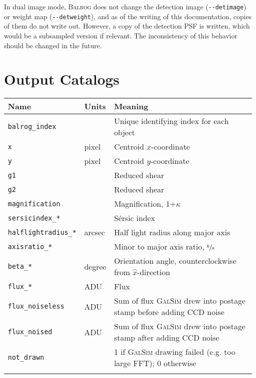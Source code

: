 \documentclass[11pt]{book}
\newcommand{\codett}[1]{\lstinline{#1}}
\newcommand{\galsim}{\textsc{GalSim}}
\newcommand{\balrog}{\textsc{Balrog}}
\newcommand{\opt}[1]{\codett{--#1}}
\newcommand{\sersic}{S\'{e}rsic}
\begin{document}
In dual image mode, \balrog{} does not change the detection image (\opt{detimage}) or weight map (\opt{detweight}), and 
as of the writing of this documentation, copies of them do not write out.
However, a copy of the detection PSF is written, which would be a subsampled version if relevant.
The inconsistency of this behavior should be changed in the future. 


\section{Output Catalogs}
\label{sec:catalogs}

\begin{table}
\caption{\balrog{}'s output truth catalog.}
\label{tab:truth}
\begin{longtabu} to \textwidth {l l X}
\toprule %
{} Name & Units & Meaning \\ \midrule
\texttt{balrog\_index} &  & Unique identifying index for each object\\
\texttt{x} & pixel & Centroid $x$-coordinate\\
\texttt{y} & pixel & Centroid $y$-coordinate\\
\texttt{g1} & & Reduced shear\\
\texttt{g2} & & Reduced shear\\
\texttt{magnification} & & Magnification, 1+$\kappa$ \\
\texttt{sersicindex\_*} & & \sersic{} index \\
\texttt{halflightradius\_*} & arcsec & Half light radius along major axis\\
\texttt{axisratio\_*} & & Minor to major axis ratio, $\sfrac{b}{a}$ \\
\texttt{beta\_*} & degree & Orientation angle, counterclockwise from $\hat{x}$-direction\\
\texttt{flux\_*} & ADU & Flux\\
\texttt{flux\_noiseless} & ADU & Sum of flux \galsim{} drew into postage stamp before adding CCD noise\\
\texttt{flux\_noised} & ADU & Sum of flux \galsim{} drew into postage stamp after adding CCD noise\\
\texttt{not\_drawn} & & 1 if \galsim{} drawing failed (e.g. too large FFT); 0 otherwise \\
 & & \\

\end{longtabu}
\end{table}
\end{document}
